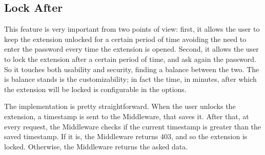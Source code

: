 \subsection{Lock After}

This feature is very important from two points of view: first, it allows the user to keep the extension unlocked for a certain period of time avoiding the need to enter the password every time the extension is opened. Second, it allows the user to lock the extension after a certain period of time, and ask again the password. So it touches both usability and security, finding a balance between the two. The is balance stands is the customizability; in fact the time, in minutes, after which the extension will be locked is configurable in the options. 

The implementation is pretty straightforward. When the user unlocks the extension, a timestamp is sent to the Middleware, that saves it. After that, at every request, the Middleware checks if the current timestamp is greater than the saved timestamp. If it is, the Middleware returns 403, and so the extension is locked. Otherwise, the Middleware returns the asked data. 

